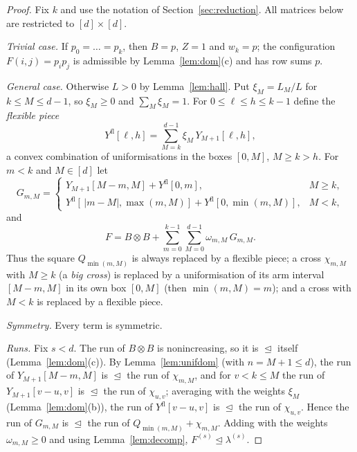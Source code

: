\documentclass[11pt]{amsart}
\theoremstyle{definition}
\theoremstyle{remark}
\numberwithin{equation}{section}
\newcommand{\dom}{\trianglelefteq}
\begin{document}
\begin{proof}
Fix $k$ and use the notation of Section~\ref{sec:reduction}. All matrices below are restricted to
$[d]\times[d]$.

\emph{Trivial case.} If $p_0=\dots=p_k$, then $B=p$, $Z=1$ and $w_k=p$; the configuration
$F(i,j)=p_ip_j$ is admissible by Lemma~\ref{lem:dom}(c) and has row sums $p$.

\emph{General case.} Otherwise $L>0$ by Lemma~\ref{lem:hall}. Put $\xi_M=L_M/L$ for $k\le M\le d-1$,
so $\xi_M\ge0$ and $\sum_M\xi_M=1$. For $0\le\ell\le h\le k-1$ define the \emph{flexible piece}
\[
  Y^{\mathrm{fl}}[\ell,h]=\sum_{M=k}^{d-1}\xi_M\,Y_{M+1}[\ell,h] ,
\]
a convex combination of uniformisations in the boxes $[0,M]$, $M\ge k>h$. For $m<k$ and $M\in[d]$ let
\[
  G_{m,M}=
  \begin{cases}
    Y_{M+1}[M-m,M]+Y^{\mathrm{fl}}[0,m], & M\ge k,\\[2pt]
    Y^{\mathrm{fl}}[\,|m-M|,\max(m,M)]+Y^{\mathrm{fl}}[0,\min(m,M)], & M<k,
  \end{cases}
\]
and
\[
  F=B\otimes B+\sum_{m=0}^{k-1}\sum_{M=0}^{d-1}\omega_{m,M}\,G_{m,M} .
\]
Thus the square $Q_{\min(m,M)}$ is always replaced by a flexible piece; a cross $\chi_{m,M}$ with
$M\ge k$ (a \emph{big cross}) is replaced by a uniformisation of its arm interval $[M-m,M]$ in its own
box $[0,M]$ (then $\min(m,M)=m$); and a cross with $M<k$ is replaced by a flexible piece.

\emph{Symmetry.} Every term is symmetric.

\emph{Runs.} Fix $s<d$. The run of $B\otimes B$ is nonincreasing, so it is $\dom$ itself
(Lemma~\ref{lem:dom}(c)). By Lemma~\ref{lem:unifdom} (with $n=M+1\le d$), the run of
$Y_{M+1}[M-m,M]$ is $\dom$ the run of $\chi_{m,M}$, and for $v<k\le M$ the run of
$Y_{M+1}[v-u,v]$ is $\dom$ the run of $\chi_{u,v}$; averaging with the weights $\xi_M$
(Lemma~\ref{lem:dom}(b)), the run of $Y^{\mathrm{fl}}[v-u,v]$ is $\dom$ the run of $\chi_{u,v}$. Hence
the run of $G_{m,M}$ is $\dom$ the run of $Q_{\min(m,M)}+\chi_{m,M}$. Adding with the weights
$\omega_{m,M}\ge0$ and using Lemma~\ref{lem:decomp}, $F^{(s)}\dom\lambda^{(s)}$.


\end{proof}
\end{document}
